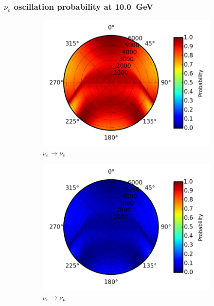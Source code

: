 \documentclass{beamer}
\begin{document}
\begin{frame}
	\frametitle{$\nu_{e}$ oscillation probability at \SI{10.0}{GeV}}
	\begin{figure}
		\centering
		\begin{subfigure}[b]{0.33\linewidth}
			\caption{ $\nu_{e} \rightarrow \nu_{e}$ }
			\includegraphics[width=\linewidth]{earth_10.0gev_nue2nue_throughEarth.png}
		\end{subfigure}
		\begin{subfigure}[b]{0.33\linewidth}
			\caption{ $\nu_{e} \rightarrow \nu_{\mu}$ }
			\includegraphics[width=\linewidth]{earth_10.0gev_nue2numu_throughEarth.png}
		\end{subfigure}
		\begin{subfigure}[b]{0.33\linewidth}

\end{subfigure}
\end{figure}
\end{frame}
\end{document}
